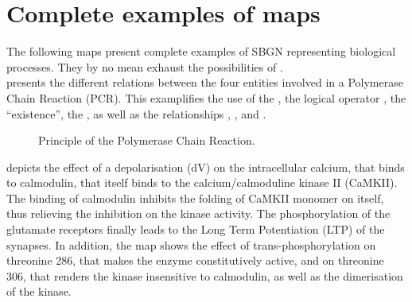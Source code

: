 \chapter{Complete examples of \SBGNERLone maps}

The following maps present complete examples of SBGN \ERs representing biological processes. They by no mean exhaust the possibilities of  \SBGNERLone.\\

 presents the different relations between the four entities involved in a Polymerase Chain Reaction (PCR). This examplifies the use of the , the logical operator , the  ``existence'', the , as well as the relationships , ,  and .

\begin{figure}[htb]
\begin{center}
\caption{Principle of the Polymerase Chain Reaction.}\label{fig:PCR}
\end{center}
\end{figure}

 depicts the effect of a depolarisation (dV) on the intracellular calcium, that binds to calmodulin, that itself binds to the calcium/calmoduline kinase II (CaMKII). The binding of calmodulin inhibits the folding of CaMKII monomer on itself, thus relieving the inhibition on the kinase activity. The phosphorylation of the glutamate receptors finally leads to the Long Term Potentiation (LTP) of the synapses. In addition, the map shows the effect of trans-phosphorylation on threonine 286, that makes the enzyme constitutively active, and on threonine 306, that renders the kinase insensitive to calmodulin, as well as the dimerisation of the kinase.


